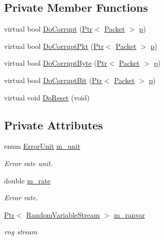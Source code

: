 \subsection*{Private Member Functions}
\begin{DoxyCompactItemize}
\item 
virtual bool \hyperlink{classns3_1_1RateErrorModel_a149b2503d4cd475be4dc1d5b9ceb7756}{Do\+Corrupt} (\hyperlink{classns3_1_1Ptr}{Ptr}$<$ \hyperlink{classns3_1_1Packet}{Packet} $>$ \hyperlink{lte__link__budget__x2__handover__measures_8m_ac9de518908a968428863f829398a4e62}{p})
\item 
virtual bool \hyperlink{classns3_1_1RateErrorModel_ace84870b1dbda5d1e4b79f15975b2eaa}{Do\+Corrupt\+Pkt} (\hyperlink{classns3_1_1Ptr}{Ptr}$<$ \hyperlink{classns3_1_1Packet}{Packet} $>$ \hyperlink{lte__link__budget__x2__handover__measures_8m_ac9de518908a968428863f829398a4e62}{p})
\item 
virtual bool \hyperlink{classns3_1_1RateErrorModel_a03b00d269dc17f67f3644e72117759b3}{Do\+Corrupt\+Byte} (\hyperlink{classns3_1_1Ptr}{Ptr}$<$ \hyperlink{classns3_1_1Packet}{Packet} $>$ \hyperlink{lte__link__budget__x2__handover__measures_8m_ac9de518908a968428863f829398a4e62}{p})
\item 
virtual bool \hyperlink{classns3_1_1RateErrorModel_a65d704998438f8c198be4c15e7a9bc46}{Do\+Corrupt\+Bit} (\hyperlink{classns3_1_1Ptr}{Ptr}$<$ \hyperlink{classns3_1_1Packet}{Packet} $>$ \hyperlink{lte__link__budget__x2__handover__measures_8m_ac9de518908a968428863f829398a4e62}{p})
\item 
virtual void \hyperlink{classns3_1_1RateErrorModel_aacb1044ae954e1dd179645ceff15b225}{Do\+Reset} (void)
\end{DoxyCompactItemize}
\subsection*{Private Attributes}
\begin{DoxyCompactItemize}
\item 
enum \hyperlink{classns3_1_1RateErrorModel_a4da336ba2dfcb55e0b7d7a3e7e713c02}{Error\+Unit} \hyperlink{classns3_1_1RateErrorModel_a75b25e124364618bf15d66d0634c9cd4}{m\+\_\+unit}
\begin{DoxyCompactList}\small\item\em Error rate unit. \end{DoxyCompactList}\item 
double \hyperlink{classns3_1_1RateErrorModel_a024517a97a3487e851dbdfffb291cbd2}{m\+\_\+rate}
\begin{DoxyCompactList}\small\item\em Error rate. \end{DoxyCompactList}\item 
\hyperlink{classns3_1_1Ptr}{Ptr}$<$ \hyperlink{classns3_1_1RandomVariableStream}{Random\+Variable\+Stream} $>$ \hyperlink{classns3_1_1RateErrorModel_ab1b5b03b825edbd1d566213501aacca6}{m\+\_\+ranvar}
\begin{DoxyCompactList}\small\item\em rng stream \end{DoxyCompactList}\end{DoxyCompactItemize}
